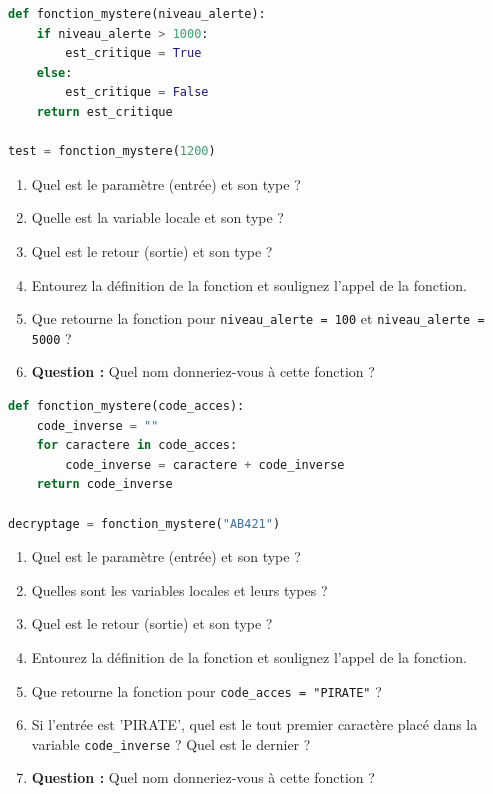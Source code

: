 \begin{Exercise}[title={Signal Beta (Simple) }]
\begin{lstlisting}[style=pythonstyle, language=python]
def fonction_mystere(niveau_alerte):
    if niveau_alerte > 1000:
        est_critique = True
    else:
        est_critique = False
    return est_critique

test = fonction_mystere(1200)
\end{lstlisting}
\begin{enumerate}
    \item Quel est le paramètre (entrée) et son type ?
    \item Quelle est la variable locale et son type ?
    \item Quel est le retour (sortie) et son type ?
    \item Entourez la définition de la fonction et soulignez l'appel de la fonction.
    \item Que retourne la fonction pour \texttt{niveau\_alerte = 100} et \texttt{niveau\_alerte = 5000} ?
    \item \textbf{Question :} Quel nom donneriez-vous à cette fonction ? 
\end{enumerate}
\end{Exercise}

\begin{Exercise}[title={Cryptage de la station (Complexe) }]
\begin{lstlisting}[style=pythonstyle, language=python]
def fonction_mystere(code_acces):
    code_inverse = ""
    for caractere in code_acces:
        code_inverse = caractere + code_inverse
    return code_inverse

decryptage = fonction_mystere("AB421")
\end{lstlisting}
\begin{enumerate}
    \item Quel est le paramètre (entrée) et son type ?
    \item Quelles sont les variables locales et leurs types ?
    \item Quel est le retour (sortie) et son type ?
    \item Entourez la définition de la fonction et soulignez l'appel de la fonction.
    \item Que retourne la fonction pour \texttt{code\_acces = "PIRATE"} ?
    \item Si l'entrée est 'PIRATE', quel est le tout premier caractère placé dans la variable \texttt{code\_inverse} ? Quel est le dernier ?
    \item \textbf{Question :} Quel nom donneriez-vous à cette fonction ? 
\end{enumerate}
\end{Exercise}

